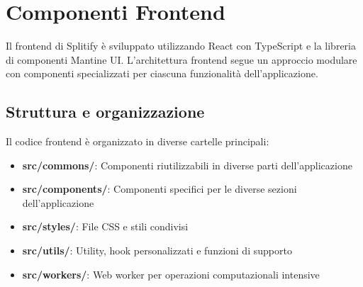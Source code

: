 \documentclass[11pt]{article}
\begin{document}
\section{Componenti Frontend}
Il frontend di Splitify è sviluppato utilizzando React con TypeScript e la libreria di componenti Mantine UI. L'architettura frontend segue un approccio modulare con componenti specializzati per ciascuna funzionalità dell'applicazione.

\subsection{Struttura e organizzazione}
Il codice frontend è organizzato in diverse cartelle principali:
\begin{itemize}
    \item \textbf{src/commons/}: Componenti riutilizzabili in diverse parti dell'applicazione
    \item \textbf{src/components/}: Componenti specifici per le diverse sezioni dell'applicazione
    \item \textbf{src/styles/}: File CSS e stili condivisi
    \item \textbf{src/utils/}: Utility, hook personalizzati e funzioni di supporto
    \item \textbf{src/workers/}: Web worker per operazioni computazionali intensive
\end{itemize}
\end{document}
